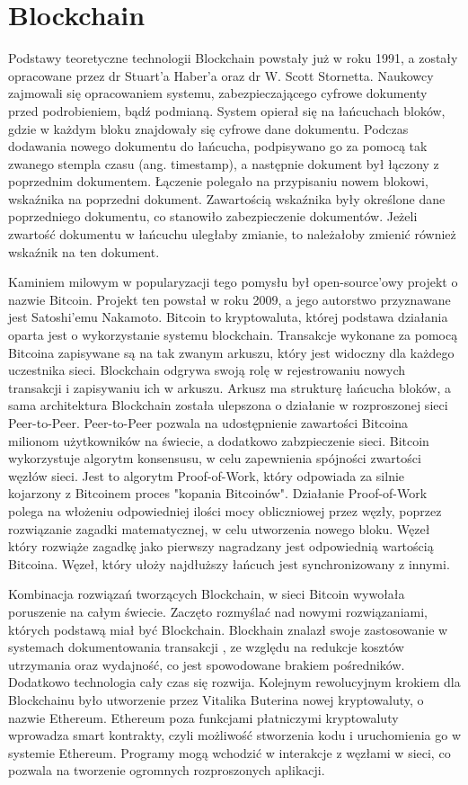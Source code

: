 \documentclass[a4paper,13pt]{report}
\begin{document}
\chapter{Blockchain}
Podstawy teoretyczne technologii Blockchain powstały już w roku 1991, a zostały opracowane przez dr Stuart'a Haber'a oraz dr W. Scott Stornetta. Naukowcy zajmowali się opracowaniem systemu, zabezpieczającego cyfrowe dokumenty przed podrobieniem, bądź podmianą. System opierał się na łańcuchach bloków, gdzie w każdym bloku znajdowały się cyfrowe dane dokumentu. Podczas dodawania nowego dokumentu do łańcucha, podpisywano go za pomocą tak zwanego stempla czasu (ang. timestamp), a następnie dokument był łączony z poprzednim dokumentem. Łączenie polegało na przypisaniu nowem blokowi, wskaźnika na poprzedni dokument. Zawartością wskaźnika były określone dane poprzedniego dokumentu, co stanowiło zabezpieczenie dokumentów. Jeżeli zwartość dokumentu w łańcuchu uległaby zmianie, to należałoby zmienić również wskaźnik na ten dokument\cite{pa}.

Kaminiem milowym w popularyzacji tego pomysłu był open-source'owy projekt o nazwie Bitcoin. Projekt ten powstał w roku 2009, a jego autorstwo przyznawane jest Satoshi'emu Nakamoto. Bitcoin to kryptowaluta, której podstawa działania oparta jest o wykorzystanie systemu blockchain. Transakcje wykonane za pomocą Bitcoina zapisywane są na tak zwanym arkuszu, który jest widoczny dla każdego uczestnika sieci. Blockchain odgrywa swoją rolę w rejestrowaniu nowych transakcji i zapisywaniu ich w arkuszu. Arkusz ma strukturę łańcucha bloków, a sama architektura Blockchain została ulepszona o działanie w rozproszonej sieci Peer-to-Peer. Peer-to-Peer pozwala na udostępnienie zawartości Bitcoina milionom użytkowników na świecie, a dodatkowo zabzpieczenie sieci. Bitcoin wykorzystuje algorytm konsensusu, w celu zapewnienia spójności zwartości węzłów sieci. Jest to algorytm Proof-of-Work, który odpowiada za silnie kojarzony z Bitcoinem proces "kopania Bitcoinów".
Działanie Proof-of-Work polega na włożeniu odpowiedniej ilości mocy obliczniowej przez węzły, poprzez rozwiązanie zagadki matematycznej, w celu utworzenia nowego bloku. Węzeł który rozwiąże zagadkę jako pierwszy nagradzany jest odpowiednią wartością Bitcoina. Węzeł, który ułoży najdłuższy łańcuch jest synchronizowany z innymi\cite{bitcoin}.

Kombinacja rozwiązań tworzących Blockchain, w sieci Bitcoin wywołała poruszenie na całym świecie. Zaczęto rozmyślać nad nowymi rozwiązaniami, których podstawą miał być Blockchain. Blockhain znalazł swoje zastosowanie w systemach dokumentowania transakcji , ze względu na redukcje kosztów utrzymania oraz wydajność, co jest spowodowane\cite{business} brakiem pośredników. Dodatkowo technologia cały czas się rozwija. Kolejnym rewolucyjnym krokiem dla Blockchainu było utworzenie przez Vitalika Buterina nowej kryptowaluty, o nazwie Ethereum. Ethereum poza funkcjami płatniczymi kryptowaluty wprowadza smart kontrakty, czyli możliwość stworzenia kodu i uruchomienia go w systemie Ethereum. Programy mogą wchodzić w interakcje z węzłami w sieci, co pozwala na tworzenie ogromnych rozproszonych aplikacji.
\end{document}
